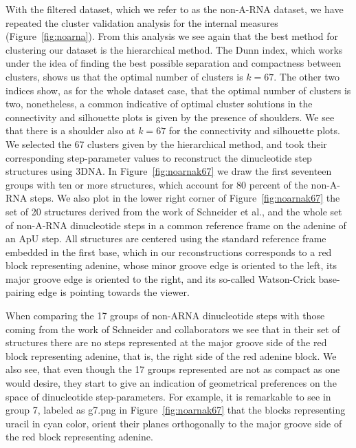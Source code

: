 With the filtered dataset, which we refer to as the non-A-RNA dataset,
we  have repeated  the cluster  validation analysis  for  the internal
measures  (Figure~\ref{fig:noarna}). From this  analysis we  see again
that the  best method for  clustering our dataset is  the hierarchical
method. The Dunn index, which works under the idea of finding the best
possible separation  and compactness  between clusters, shows  us that
the optimal number of clusters  is $k=67$. The other two indices show,
as for the whole dataset case,  that the optimal number of clusters is
two, nonetheless, a common  indicative of optimal cluster solutions in
the  connectivity and  silhouette plots  is given  by the  presence of
shoulders.  We  see that there  is a shoulder  also at $k=67$  for the
connectivity and  silhouette plots. We selected the  67 clusters given
by   the   hierarchical   method,   and   took   their   corresponding
step-parameter values to  reconstruct the dinucleotide step structures
using 3DNA.  In Figure~\ref{fig:noarnak67} we draw the first seventeen
groups with  ten or more structures,  which account for  80 percent of
the  non-A-RNA steps.   We  also plot  in  the lower  right corner  of
Figure~\ref{fig:noarnak67} the  set of 20 structures  derived from the
work  of Schneider et  al.\cite{schneider2004}, and  the whole  set of
non-A-RNA  dinucleotide  steps in  a  common  reference  frame on  the
adenine  of  an ApU  step.   All  structures  are centered  using  the
standard  reference frame  embedded in  the  first base,  which in  our
reconstructions corresponds to a red block representing adenine, whose
minor groove  edge is oriented to  the left, its major  groove edge is
oriented  to the  right, and  its so-called  Watson-Crick base-pairing
edge is pointing towards the viewer.

When comparing the 17 groups of non-ARNA dinucleotide steps with those
coming from  the work  of Schneider and  collaborators we see  that in
their set  of structures there are  no steps represented  at the major
groove side of the red  block representing adenine, that is, the right
side of  the red adenine block. We  also see, that even  though the 17
groups represented are not as  compact as one would desire, they start
to  give an  indication of  geometrical  preferences on  the space  of
dinucleotide step-parameters.  For example, it is remarkable to see in
group  7, labeled  as  g7.png in  Figure~\ref{fig:noarnak67} that  the
blocks  representing  uracil  in   cyan  color,  orient  their  planes
orthogonally to  the major groove  side of the red  block representing
adenine.

